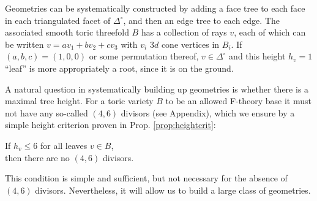 \documentclass[aps,prl,twocolumn, superscriptaddress,groupedaddress,nofootinbib]{revtex4-1}
\begin{document}
Geometries can be systematically constructed by adding a face tree to each face in each triangulated facet of $\Delta^\circ$, and then an edge tree to each edge. The associated smooth toric
threefold $B$ has a collection of rays $v$, each of which can be written $v=av_1+bv_2+cv_3$ with $v_i$ $3d$ cone vertices in $B_i$. If $(a,b,c)=(1,0,0)$ or some
permutation thereof, $v\in \Delta^\circ$ and this height $h_v=1$ ``leaf'' is more
appropriately a root, since it is on the ground.

A natural question
in systematically building up geometries is whether there is
a maximal tree height. For a toric variety $B$ to be an allowed
F-theory base it must not have any so-called $(4,6)$ divisors (see Appendix), which
we ensure by a simple height criterion proven in Prop. \ref{prop:heightcrit}:
\begin{center}
If $h_v\leq 6$ for all leaves $v\in B$, \\ then there are no $(4,6)$
divisors.
\end{center}
This condition is simple and sufficient, but not necessary
for the absence of $(4,6)$ divisors. Nevertheless, it
will allow us to build a large class of geometries.
\end{document}
